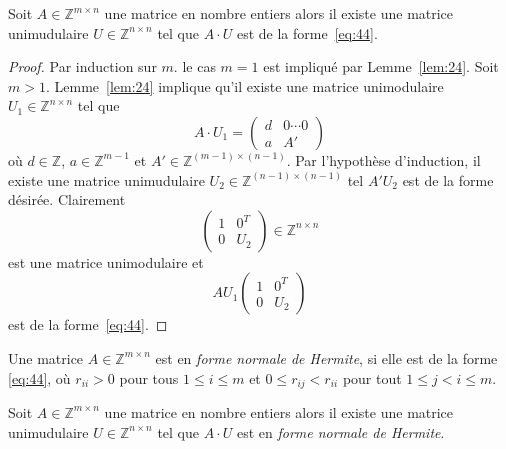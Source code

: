   \begin{corollary}
    \label{co:9}
    Soit  $A ∈ℤ^{ m ×n}$ une matrice en nombre entiers alors il  existe une matrice unimudulaire $U ∈ℤ^{ n ×n}$ tel que $A ⋅U$ est de la forme~\eqref{eq:44}.
  \end{corollary}
  \begin{proof}
    Par induction sur $m$. le cas $m=1$ est impliqué par Lemme~\ref{lem:24}. Soit $m>1$. 
    Lemme~\ref{lem:24} implique qu'il existe une matrice unimodulaire $U_1 ∈ℤ^{n ×n}$ tel que
    \begin{displaymath}
      A ⋅ U_1 =
      \begin{pmatrix}
        d & 0 \cdots 0 \\
        a  & A'
      \end{pmatrix}
    \end{displaymath}
    où $d ∈ℤ$, $a ∈ ℤ^{m-1}$ et $A' ∈ ℤ^{(m-1) × (n-1)}$. Par l'hypothèse d'induction, il existe une matrice unimudulaire $U_2 ∈ℤ^{(n-1) ×(n-1)}$ tel $A' U_2$ est de la forme désirée. Clairement
      \begin{displaymath}
         \begin{pmatrix}
          1 & 0^T \\
          0 & U_2
        \end{pmatrix} ∈ℤ^{n ×n}
      \end{displaymath}
      est une matrice unimodulaire et 
      \begin{displaymath}
        A U_1
        \begin{pmatrix}
          1 & 0^T \\
          0 & U_2
        \end{pmatrix}
      \end{displaymath}
      est de la  forme~\eqref{eq:44}. 
  \end{proof}



  \begin{definition}
    \label{def:49}
    Une matrice $A ∈ℤ^{m ×n}$  est en \emph{forme normale de Hermite}, si elle est de la forme \eqref{eq:44}, où $r_{ii}>0$ pour tous $1 ≤i≤ m$ et $0≤ r_{ij} < r_{ii}$ pour tout $1≤j<i≤m$. 
  \end{definition}
	
\begin{theorem}
  \label{thr:28}
    Soit  $A ∈ℤ^{ m ×n}$ une matrice en nombre entiers alors il  existe une matrice unimudulaire $U ∈ℤ^{ n ×n}$ tel que $A ⋅U$ est en \emph{forme normale de Hermite}.
  \end{theorem}
  
